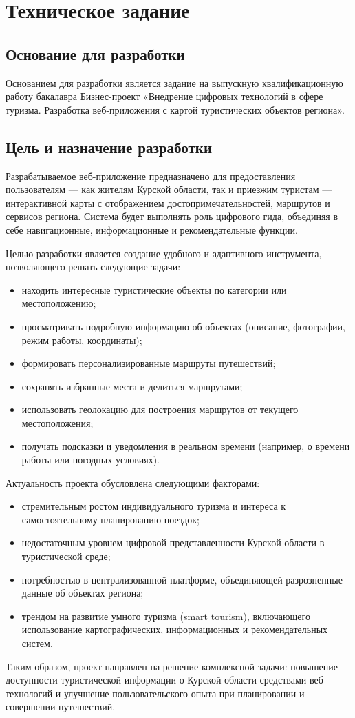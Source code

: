 \section{Техническое задание}
\subsection{Основание для разработки}

Основанием для разработки является задание на выпускную квалификационную работу бакалавра Бизнес-проект «Внедрение цифровых технологий в сфере туризма. Разработка веб-приложения с картой туристических объектов региона».

\subsection{Цель и назначение разработки}

Разрабатываемое веб-приложение предназначено для предоставления пользователям — как жителям Курской области, так и приезжим туристам — интерактивной карты с отображением достопримечательностей, маршрутов и сервисов региона. Система будет выполнять роль цифрового гида, объединяя в себе навигационные, информационные и рекомендательные функции.

Целью разработки является создание удобного и адаптивного инструмента, позволяющего решать следующие задачи:
\begin{itemize}
	\item находить интересные туристические объекты по категории или местоположению;
	\item просматривать подробную информацию об объектах (описание, фотографии, режим работы, координаты);
	\item формировать персонализированные маршруты путешествий;
	\item сохранять избранные места и делиться маршрутами;
	\item использовать геолокацию для построения маршрутов от текущего местоположения;
	\item получать подсказки и уведомления в реальном времени (например, о времени работы или погодных условиях).
\end{itemize}

Актуальность проекта обусловлена следующими факторами:
\begin{itemize}
	\item стремительным ростом индивидуального туризма и интереса к самостоятельному планированию поездок;
	\item недостаточным уровнем цифровой представленности Курской области в туристической среде;
	\item потребностью в централизованной платформе, объединяющей разрозненные данные об объектах региона;
	\item трендом на развитие умного туризма (smart tourism), включающего использование картографических, информационных и рекомендательных систем.
\end{itemize}
Таким образом, проект направлен на решение комплексной задачи: повышение доступности туристической информации о Курской области средствами веб-технологий и улучшение пользовательского опыта при планировании и совершении путешествий.

